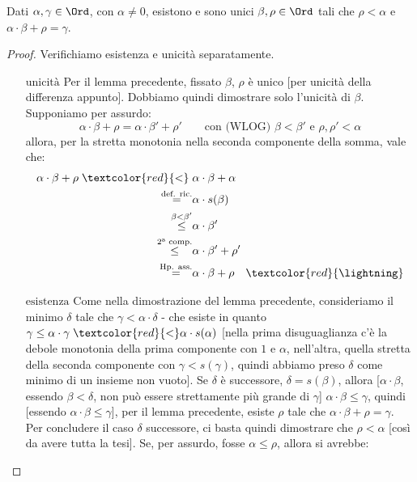 \documentclass[11pt]{scrartcl}
\begin{document}
\begin{lemma}
	Dati $\alpha,\gamma \in \Ord$, con $\alpha \ne 0$, esistono e sono unici $\beta, \rho \in \Ord$ tali che $\rho < \alpha$ e $\alpha \cdot \beta + \rho = \gamma$.
\end{lemma}

\begin{proof}
	Verifichiamo esistenza e unicità separatamente.
	\begin{itemize}
		\item[$\boxed{\text{unicità}}$] Per il lemma precedente, fissato $\beta$, $\rho$ è unico [per unicità della differenza appunto]. Dobbiamo quindi dimostrare solo l'unicità di $\beta$. Supponiamo per assurdo:
		\[ \alpha \cdot \beta + \rho = \alpha \cdot \beta' + \rho' \qquad\text{con (WLOG) $\beta < \beta'$ e $\rho,\rho'<\alpha$}
			\]
		allora, per la stretta monotonia nella seconda componente della somma, vale che:
		\[ \begin{split}
			\alpha \cdot \beta +\rho\;\textcolor{red}{<}\;& \alpha \cdot \beta + \alpha \\
									  \overset{\text{def. ric.}}{=}& \alpha \cdot s(\beta) \\
									  \overset{\beta < \beta'}{\leq}& \alpha \cdot \beta' \\
									  \overset{\text{2ª comp.}}{\leq}& \alpha \cdot \beta' + \rho' \\
									  \overset{\text{Hp. ass.}}{=}& \alpha \cdot \beta + \rho \quad \textcolor{red}{\lightning}
		\end{split}
			\]
		\item[$\boxed{\text{esistenza}}$] Come nella dimostrazione del lemma precedente, consideriamo il minimo $\delta$ tale che $\gamma < \alpha \cdot \delta$ - che esiste in quanto $\gamma \leq \alpha \cdot \gamma \; \textcolor{red}{<} \alpha \cdot s(\alpha)$ [nella prima disuguaglianza c'è la debole monotonia della prima componente 
		con $1$ e $\alpha$, nell'altra, quella stretta della seconda componente con $\gamma < s(\gamma)$, quindi abbiamo preso $\delta$ come minimo di un insieme non vuoto]. Se $\delta$ è successore, $\delta = s(\beta)$, allora [$\alpha \cdot \beta$, essendo $\beta < \delta$, non può essere strettamente più grande di $\gamma$] $\alpha \cdot \beta \leq \gamma$, quindi [essendo 
		$\alpha \cdot \beta \leq \gamma$], per il lemma precedente, esiste $\rho$ tale che $\alpha \cdot \beta + \rho = \gamma$.
		Per concludere il caso $\delta$ successore, ci basta quindi dimostrare che $\rho < \alpha$ [così da avere tutta la tesi]. Se, per assurdo, fosse $\alpha \leq \rho$, allora si avrebbe:

\end{itemize}
\end{proof}
\end{document}
